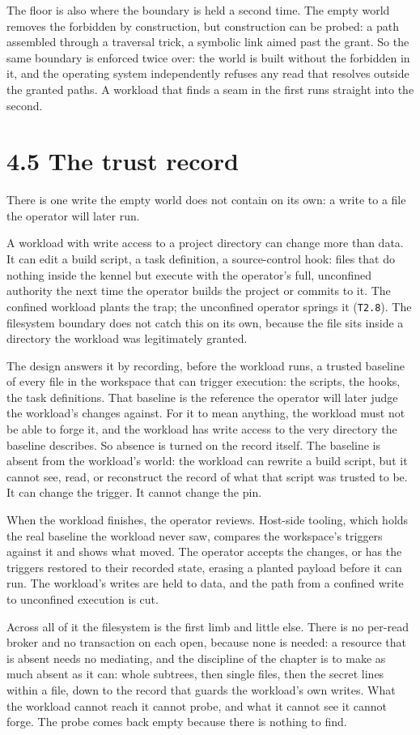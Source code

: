 The floor is also where the boundary is held a second time. The empty
world removes the forbidden by construction, but construction can be
probed: a path assembled through a traversal trick, a symbolic link
aimed past the grant. So the same boundary is enforced twice over: the
world is built without the forbidden in it, and the operating system
independently refuses any read that resolves outside the granted paths.
A workload that finds a seam in the first runs straight into the second.

\hypertarget{the-trust-record}{%
\section{4.5 The trust record}\label{the-trust-record}}

There is one write the empty world does not contain on its own: a write
to a file the operator will later run.

A workload with write access to a project directory can change more than
data. It can edit a build script, a task definition, a source-control
hook: files that do nothing inside the kennel but execute with the
operator's full, unconfined authority the next time the operator builds
the project or commits to it. The confined workload plants the trap; the
unconfined operator springs it (\texttt{T2.8}). The filesystem boundary
does not catch this on its own, because the file sits inside a directory
the workload was legitimately granted.

The design answers it by recording, before the workload runs, a trusted
baseline of every file in the workspace that can trigger execution: the
scripts, the hooks, the task definitions. That baseline is the reference
the operator will later judge the workload's changes against. For it to
mean anything, the workload must not be able to forge it, and the
workload has write access to the very directory the baseline describes.
So absence is turned on the record itself. The baseline is absent from
the workload's world: the workload can rewrite a build script, but it
cannot see, read, or reconstruct the record of what that script was
trusted to be. It can change the trigger. It cannot change the pin.

When the workload finishes, the operator reviews. Host-side tooling,
which holds the real baseline the workload never saw, compares the
workspace's triggers against it and shows what moved. The operator
accepts the changes, or has the triggers restored to their recorded
state, erasing a planted payload before it can run. The workload's
writes are held to data, and the path from a confined write to
unconfined execution is cut.

Across all of it the filesystem is the first limb and little else. There
is no per-read broker and no transaction on each open, because none is
needed: a resource that is absent needs no mediating, and the discipline
of the chapter is to make as much absent as it can: whole subtrees, then
single files, then the secret lines within a file, down to the record
that guards the workload's own writes. What the workload cannot reach it
cannot probe, and what it cannot see it cannot forge. The probe comes
back empty because there is nothing to find.
